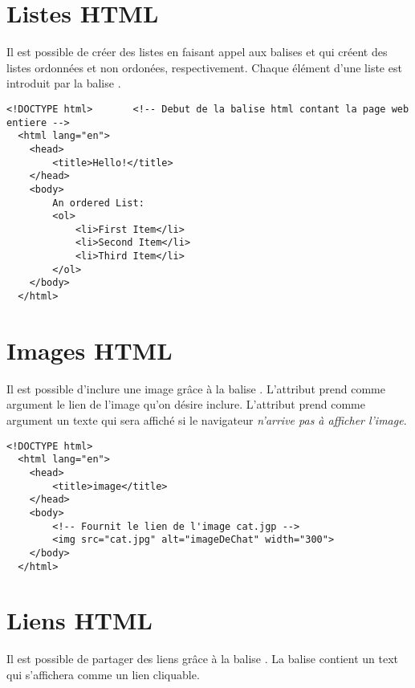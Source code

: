\documentclass{report}
\begin{document}
\section{Listes HTML}
\noindent Il est possible de créer des listes en faisant appel aux balises  et  qui créent des listes ordonnées et non ordonées, respectivement. Chaque élément d'une liste est introduit par la balise . 



\begin{ExampleDdHTML*}{}{}
  \begin{lstlisting}[style=HTMLDraculaDark]
  <!DOCTYPE html>		<!-- Debut de la balise html contant la page web entiere -->
  <html lang="en">
	<head>
		<title>Hello!</title>
	</head>
	<body>
		An ordered List:
		<ol>
			<li>First Item</li>
			<li>Second Item</li>
			<li>Third Item</li>
		</ol>
	</body>
  </html>
  \end{lstlisting}
\end{ExampleDdHTML*}



\section{Images HTML}
\noindent Il est possible d'inclure une image grâce à la balise . L'attribut  prend comme argument le lien de l'image qu'on désire inclure. L'attribut  prend comme argument un texte qui sera affiché
si le navigateur \textit{n'arrive pas à afficher l'image}. 

\begin{ExampleDdHTML*}{}{}
  \begin{lstlisting}[style=HTMLDraculaDark]
  <!DOCTYPE html>
  <html lang="en">
	<head>
		<title>image</title>
	</head>
	<body>
		<!-- Fournit le lien de l'image cat.jgp --> 
		<img src="cat.jpg" alt="imageDeChat" width="300"> 
	</body>
  </html>
  \end{lstlisting}
\end{ExampleDdHTML*}

\section{Liens HTML}
\noindent Il est possible de partager des liens grâce à la balise .
La balise contient un text qui s'affichera comme un lien cliquable. 
\end{document}
